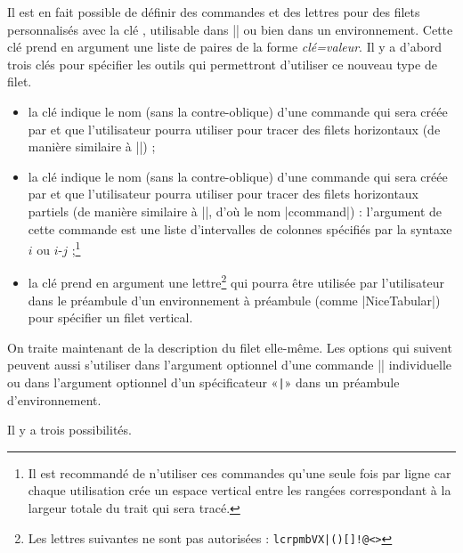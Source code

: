 \documentclass[dvipsnames]{article}%
\begin{document}
Il est en fait possible de définir des commandes et des lettres pour des filets
personnalisés avec la clé , utilisable dans
|\NiceMatrixOptions| ou bien dans un environnement. Cette clé prend en argument
une liste de paires de la forme \textsl{clé=valeur}. Il y a d'abord trois clés
pour spécifier les outils qui permettront d'utiliser ce nouveau type de filet.

\begin{itemize}
\item la clé  indique le nom (sans la contre-oblique) d'une commande
qui sera créée par  et que l'utilisateur pourra utiliser pour
tracer des filets horizontaux (de manière similaire à |\hline|) ; 

\item la clé  indique le nom (sans la contre-oblique) d'une
commande qui sera créée par  et que l'utilisateur pourra
utiliser pour tracer des filets horizontaux partiels (de manière similaire à
|\cline|, d'où le nom |ccommand|) : l'argument de cette commande est une liste
d'intervalles de colonnes spécifiés par la syntaxe $i$ ou $i$-$j$ ;\footnote{Il
  est recommandé de n'utiliser ces commandes qu'une seule fois par ligne car
  chaque utilisation crée un espace vertical entre les rangées correspondant à
  la largeur totale du trait qui sera tracé.}

\item la clé  prend en argument une lettre\footnote{Les lettres
  suivantes ne sont pas autorisées : \verb+lcrpmbVX|()[]!@<>+} qui pourra être
utilisée par l'utilisateur dans le préambule d'un environnement à préambule
(comme |{NiceTabular}|) pour spécifier un filet vertical.
\end{itemize}

\bigskip
On traite maintenant de la description du filet elle-même. Les options qui
suivent peuvent aussi s'utiliser dans l'argument optionnel d'une commande
|\Hline| individuelle ou dans l'argument optionnel d'un spécificateur «\verb+|+»
dans un préambule d'environnement.

\bigskip
Il y a trois possibilités.
\end{document}
